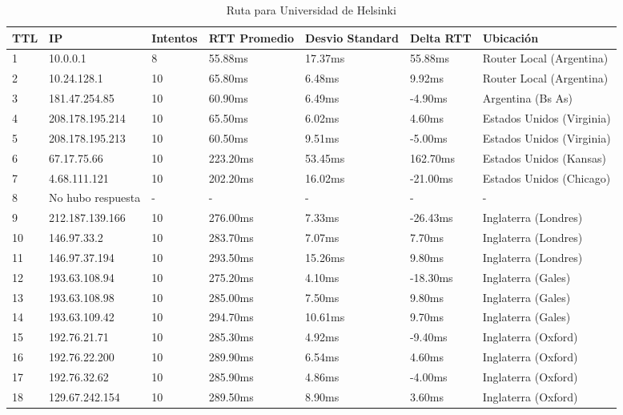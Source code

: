 \begin{table}[H]
	\centering
	\caption{Ruta para Universidad de Helsinki}
	\label{table:finlandia}
	\begin{tabular}{|l|l|l|l|l|l|l|}
		\hline
		TTL & IP & Intentos & RTT Promedio & Desvio Standard & Delta RTT & Ubicación \\ \hline 
		1 & 10.0.0.1 & 8 & 55.88ms & 17.37ms & 55.88ms & Router Local (Argentina)  \\ \hline 
		2 & 10.24.128.1 & 10 & 65.80ms & 6.48ms & 9.92ms & Router Local (Argentina)  \\ \hline 
		3 & 181.47.254.85 & 10 & 60.90ms & 6.49ms & -4.90ms & Argentina (Bs As) \\ \hline 
		4 & 208.178.195.214 & 10 & 65.50ms & 6.02ms & 4.60ms & Estados Unidos (Virginia) \\ \hline 
		5 & 208.178.195.213 & 10 & 60.50ms & 9.51ms & -5.00ms & Estados Unidos (Virginia) \\ \hline 
		6 & 67.17.75.66 & 10 & 223.20ms & 53.45ms & 162.70ms & Estados Unidos (Kansas) \\ \hline 
		7 & 4.68.111.121 & 10 & 202.20ms & 16.02ms & -21.00ms & Estados Unidos (Chicago) \\ \hline 
		8 & No hubo respuesta & - & - & - & - & - \\ \hline 
		9 & 212.187.139.166 & 10 & 276.00ms & 7.33ms & -26.43ms & Inglaterra (Londres) \\ \hline 
		10 & 146.97.33.2 & 10 & 283.70ms & 7.07ms & 7.70ms & Inglaterra (Londres) \\ \hline 
		11 & 146.97.37.194 & 10 & 293.50ms & 15.26ms & 9.80ms & Inglaterra (Londres) \\ \hline 
		12 & 193.63.108.94 & 10 & 275.20ms & 4.10ms & -18.30ms & Inglaterra (Gales) \\ \hline 
		13 & 193.63.108.98 & 10 & 285.00ms & 7.50ms & 9.80ms & Inglaterra (Gales) \\ \hline 
		14 & 193.63.109.42 & 10 & 294.70ms & 10.61ms & 9.70ms & Inglaterra (Gales) \\ \hline 
		15 & 192.76.21.71 & 10 & 285.30ms & 4.92ms & -9.40ms & Inglaterra (Oxford) \\ \hline 
		16 & 192.76.22.200 & 10 & 289.90ms & 6.54ms & 4.60ms & Inglaterra (Oxford) \\ \hline 
		17 & 192.76.32.62 & 10 & 285.90ms & 4.86ms & -4.00ms & Inglaterra (Oxford) \\ \hline 
		18 & 129.67.242.154 & 10 & 289.50ms & 8.90ms & 3.60ms & Inglaterra (Oxford) \\ \hline 
	\end{tabular}
\end{table}